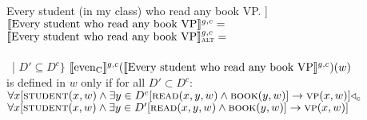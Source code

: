 \pex[nopreamble=true]\label{ex:any-sdm-demo}%
\a{} Every student (in my class) who read any book VP.
\a[]\phantomsection [even\textsubscript{C} [every student who read any book VP]]
\a{} $\intension[g,c]{Every student who read any book VP}=$\\
\a{} $\intension[g,c]{Every student who read any book VP}_{\text{\scshape alt}}=$\\\\\emptyfill~| $D'\subseteq D^c\}$
\a{} $\intension[g,c]{even\textsubscript{C}}(\intension[g,c]{Every student who read any book VP})(w)$\\is defined in $w$ only if for all $D'\subset D^c$:\\$\forall{x}[\predicate{student}(x,w)\land\exists{y\in{D^c}}[\predicate{read}(x,y,w)\land\predicate{book}(y,w)]\rightarrow\predicate{vp}(x,w)]\lprob_c$\\$\forall{x}[\predicate{student}(x,w)\land\exists{y\in{D'}}[\predicate{read}(x,y,w)\land\predicate{book}(y,w)]\rightarrow\predicate{vp}(x,w)]$
\xe

